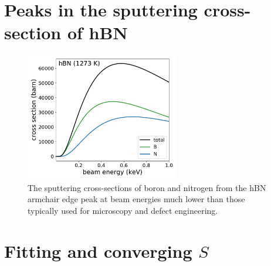\documentclass{article}
\begin{document}
\pagebreak
\section{Peaks in the sputtering cross-section of hBN}
\label{app:edgePeaks}

\begin{figure}[H]
  \centering
  \includegraphics[width=0.6\textwidth]{images/edgePeaks.pdf}
  \caption{
    The sputtering cross-sections of boron and nitrogen from the hBN armchair
    edge peak at beam energies much lower than those typically used for
    microscopy and defect engineering.
  }
  \label{fig:edgePeaks}
\end{figure}

\pagebreak
\section{Fitting and converging $S$}
\label{app:fitting}
\end{document}
